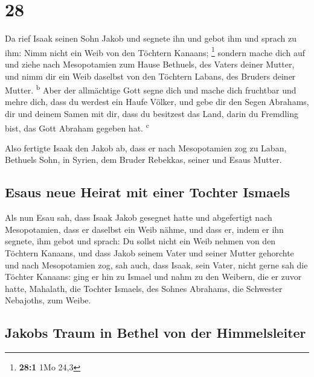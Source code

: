 \hypertarget{section-27}{%
\section{28}\label{section-27}}

 Da rief Isaak seinen Sohn Jakob und segnete ihn und gebot
ihm und sprach zu ihm: Nimm nicht ein Weib von den Töchtern Kanaans;
\footnote{\textbf{28:1} 1Mo 24,3}  sondern mache dich auf
und ziehe nach Mesopotamien zum Hause Bethuels, des Vaters deiner
Mutter, und nimm dir ein Weib daselbst von den Töchtern Labans, des
Bruders deiner Mutter. \textsuperscript{b}  Aber der
allmächtige Gott segne dich und mache dich fruchtbar und mehre dich,
dass du werdest ein Haufe Völker,  und gebe dir den Segen
Abrahams, dir und deinem Samen mit dir, dass du besitzest das Land,
darin du Fremdling bist, das Gott Abraham gegeben hat.
\textsuperscript{c}

 Also fertigte Isaak den Jakob ab, dass er nach
Mesopotamien zog zu Laban, Bethuels Sohn, in Syrien, dem Bruder
Rebekkas, seiner und Esaus Mutter.

\hypertarget{esaus-neue-heirat-mit-einer-tochter-ismaels}{%
\subsection{Esaus neue Heirat mit einer Tochter
Ismaels}\label{esaus-neue-heirat-mit-einer-tochter-ismaels}}

 Als nun Esau sah, dass Isaak Jakob gesegnet hatte und
abgefertigt nach Mesopotamien, dass er daselbst ein Weib nähme, und dass
er, indem er ihn segnete, ihm gebot und sprach: Du sollst nicht ein Weib
nehmen von den Töchtern Kanaans,  und dass Jakob seinem
Vater und seiner Mutter gehorchte und nach Mesopotamien zog,
 sah auch, dass Isaak, sein Vater, nicht gerne sah die
Töchter Kanaans:  ging er hin zu Ismael und nahm zu den
Weibern, die er zuvor hatte, Mahalath, die Tochter Ismaels, des Sohnes
Abrahams, die Schwester Nebajoths, zum Weibe.

\hypertarget{jakobs-traum-in-bethel-von-der-himmelsleiter}{%
\subsection{Jakobs Traum in Bethel von der
Himmelsleiter}\label{jakobs-traum-in-bethel-von-der-himmelsleiter}}

